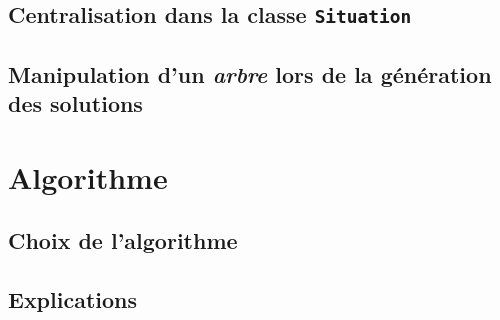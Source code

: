 \documentclass{article}
\begin{document}
    \subsection{Centralisation dans la classe \texttt{Situation}}
    \subsection{Manipulation d'un \textit{arbre} lors de la génération des solutions}

\section{Algorithme}
    \subsection{Choix de l'algorithme}
    \subsection{Explications}
\end{document}
